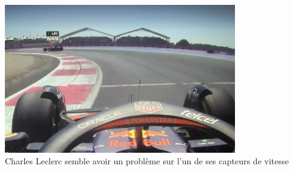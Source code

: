 \documentclass{magnolia}
\begin{document}
  \begin{center}
    \includegraphics[width = 10cm]{../../Commun/Images/python-cours-nan}\\
    Charles Leclerc semble avoir un problème sur l'un de ses capteurs de vitesse
  \end{center}
\end{document}
